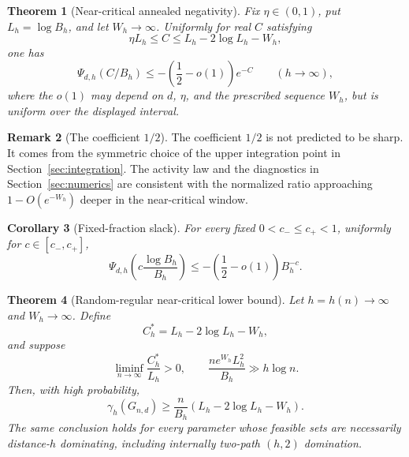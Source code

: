 \documentclass[11pt]{amsart}
\newtheorem{theorem}{Theorem}[section]
\newtheorem{corollary}[theorem]{Corollary}
\theoremstyle{definition}
\newtheorem{remark}[theorem]{Remark}
\begin{document}
\begin{theorem}[Near-critical annealed negativity]\label{thm:near-critical}
Fix $\eta\in(0,1)$, put $L_h=\log B_h$, and let $W_h\to\infty$.  Uniformly for real $C$ satisfying
\begin{equation}\label{eq:C-window}
 \eta L_h\le C\le L_h-2\log L_h-W_h,
\end{equation}
one has
\begin{equation}\label{eq:near-critical-psi}
 \Psi_{d,h}(C/B_h)
 \le-\left(\frac12-o(1)\right)e^{-C}
 \qquad(h\to\infty),
\end{equation}
where the $o(1)$ may depend on $d$, $\eta$, and the prescribed sequence $W_h$, but is uniform over the displayed interval.
\end{theorem}

\begin{remark}[The coefficient $1/2$]\label{rem:half-artifact}
The coefficient $1/2$ is not predicted to be sharp.  It comes from the symmetric choice of the upper integration point in Section~\ref{sec:integration}.  The activity law and the diagnostics in Section~\ref{sec:numerics} are consistent with the normalized ratio approaching $1-O(e^{-W_h})$ deeper in the near-critical window.
\end{remark}

\begin{corollary}[Fixed-fraction slack]\label{cor:fixed-slack}
For every fixed $0<c_-\le c_+<1$, uniformly for $c\in[c_-,c_+]$,
\[
 \Psi_{d,h}\!\left(c\frac{\log B_h}{B_h}\right)
 \le-\left(\frac12-o(1)\right)B_h^{-c}.
\]
\end{corollary}

\begin{theorem}[Random-regular near-critical lower bound]\label{thm:random-near-critical}
Let $h=h(n)\to\infty$ and $W_h\to\infty$.  Define
\[
 C_h^*=L_h-2\log L_h-W_h,
\]
and suppose
\begin{equation}\label{eq:near-growth-condition}
 \liminf_{n\to\infty}\frac{C_h^*}{L_h}>0,
 \qquad
 \frac{n e^{W_h}L_h^2}{B_h}\gg h\log n.
\end{equation}
Then, with high probability,
\begin{equation}\label{eq:near-gamma-lower}
 \gamma_h(G_{n,d})\ge
 \frac n{B_h}\left(L_h-2\log L_h-W_h\right).
\end{equation}
The same conclusion holds for every parameter whose feasible sets are necessarily distance-$h$ dominating, including internally two-path $(h,2)$ domination.
\end{theorem}
\end{document}
